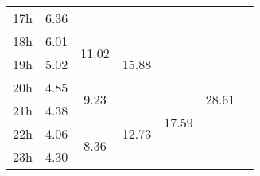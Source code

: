 \begin{center}
\begin{tabular}{| l || c | c | c | c | c | c |}
17h & \multirow{1}{*}{ 6.36 }  & & & & & \\\cline{2-2}\cline{3-3}\cline{4-4}\cline{6-6}
18h & \multirow{1}{*}{ 6.01 }  & \multirow{2}{*}{ 11.02 }  & \multirow{3}{*}{ 15.88 }  & & \multirow{6}{*}{ 28.61 }  & \\\cline{2-2}
19h & \multirow{1}{*}{ 5.02 }  & & & & & \\\cline{2-2}\cline{3-3}\cline{5-5}
20h & \multirow{1}{*}{ 4.85 }  & \multirow{2}{*}{ 9.23 }  & & \multirow{4}{*}{ 17.59 }  & & \\\cline{2-2}\cline{4-4}
21h & \multirow{1}{*}{ 4.38 }  & & \multirow{3}{*}{ 12.73 }  & & & \\\cline{2-2}\cline{3-3}
22h & \multirow{1}{*}{ 4.06 }  & \multirow{2}{*}{ 8.36 }  & & & & \\\cline{2-2}
23h & \multirow{1}{*}{ 4.30 }  & & & & & \\\cline{2-2}\cline{3-3}\cline{4-4}\cline{5-5}\cline{6-6}\cline{7-7}
\hline\end{tabular}
\end{center}